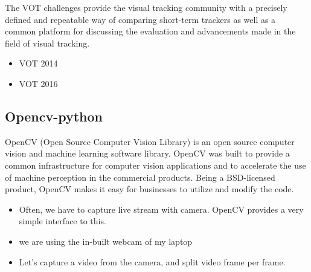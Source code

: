 \documentclass[a4paper]{article}
\begin{document}
The VOT challenges provide the visual tracking community with a precisely defined and repeatable way of comparing short-term trackers as well as a common platform for discussing the evaluation and advancements made in the field of visual tracking.
\cite{VOT2014} \cite{VOT2016}
\begin{itemize}
    \item VOT 2014
    \item VOT 2016
\end{itemize}




\subsection{Opencv-python}
OpenCV (Open Source Computer Vision Library) is an open source computer vision and machine learning software library. OpenCV was built to provide a common infrastructure for computer vision applications and to accelerate the use of machine perception in the commercial products. Being a BSD-licensed product, OpenCV makes it easy for businesses to utilize and modify the code.

\begin{itemize}
    \item Often, we have to capture live stream with camera. OpenCV provides a very simple interface to this. 
    \item we are using the in-built webcam of my laptop
    \item Let’s capture a video from the camera, and split video frame per frame. 
\end{itemize}
\end{document}
